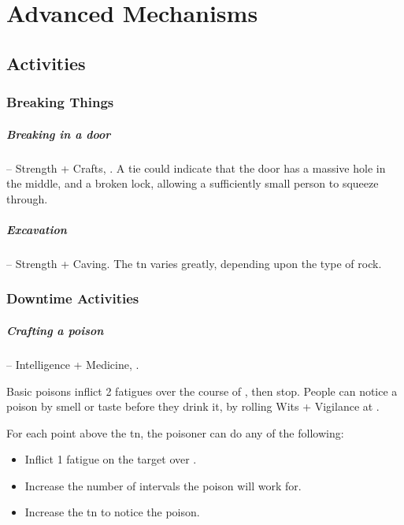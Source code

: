 \chapter{Advanced Mechanisms}

\label{skill_uses}

\section{Activities}

\begin{multicols}{2}

\subsection{Breaking Things}

\paragraph{Breaking in a door} -- Strength + Crafts, .
A tie could indicate that the door has a massive hole in the middle, and a broken lock, allowing a sufficiently small person to squeeze through.

\paragraph{Excavation} -- Strength + Caving.
The \gls{tn} varies greatly, depending upon the type of rock.

\subsection{Downtime Activities}

\paragraph{Crafting a poison} -- Intelligence + Medicine, .
\label{poison}

Basic poisons inflict 2 \glspl{fatigue} over the course of , then stop.
People can notice a poison by smell or taste before they drink it, by rolling Wits + Vigilance at .

For each point above the \gls{tn}, the poisoner can do any of the following:

\begin{itemize}
  \item
  Inflict 1 \gls{fatigue} on the target over .
  \item
  Increase the number of \glspl{interval} the poison will work for.
  \item
  Increase the \gls{tn} to notice the poison.
\end{itemize}


\end{multicols}
